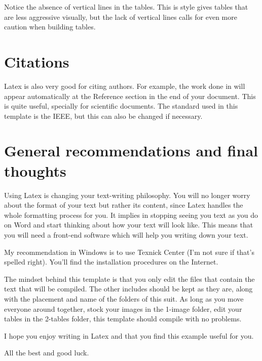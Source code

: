 	Notice the absence of vertical lines in the tables.
	This is style gives tables that are less aggressive visually, but the lack of vertical lines calls for even more caution when building tables. 
	

\section{Citations}

Latex is also very good for citing authors. For example, the work done in \cite{Meyer} will appear automatically at the Reference section in the end of your document.
This is quite useful, specially for scientific documents. 
The standard used in this template is the IEEE, but this can also be changed if necessary.
	
\section{General recommendations and final thoughts}

Using Latex is changing your text-writing philosophy.
You will no longer worry about the format of your text but rather its content, since Latex handles the whole formatting process for you.
It implies in stopping seeing you text as you do on Word and start thinking about how your text will look like. 
This means that you will need a front-end software which will help you writing down your text. 

My recommendation in Windows is to use Texnick Center (I'm not sure if that's spelled right). 
You'll find the installation procedures on the Internet. 

The mindset behind this template is that you only edit the files that contain the text that will be compiled. 
The other includes should be kept as they are, along with the placement and name of the folders of this suit. 
As long as you move everyone around together, stock your images in the 1-image folder, edit your tables in the 2-tables folder, this template should compile with no problems. 

I hope you enjoy writing in Latex and that you find this example useful for you.

All the best and good luck.




	
	
	
	

\newpage


